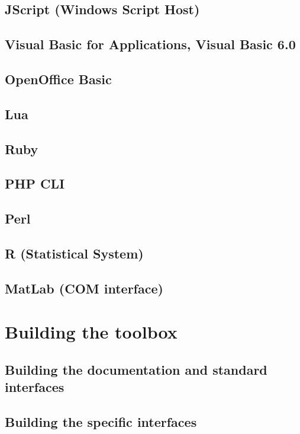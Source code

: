 \documentclass[12pt,a4paper,openany]{book}
\begin{document}
\section{JScript (Windows Script Host)}

\section{Visual Basic for Applications, Visual Basic 6.0}

\section{OpenOffice Basic}

\section{Lua}

\section{Ruby}

\section{PHP CLI}

\section{Perl}

\section{R (Statistical System)}

\section{MatLab (COM interface)}

\chapter{Building the toolbox}

\section{Building the documentation and standard interfaces}

\section{Building the specific interfaces}
\end{document}
